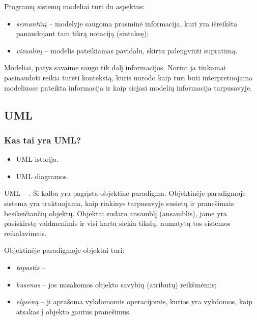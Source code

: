 Programų sistemų modeliai turi du aspektus:
\begin{itemize}
  \item \emph{semantinį} – modelyje saugoma prasminė informacija, kuri
    yra išreikšta panaudojant tam tikrą notaciją (sintaksę);
  \item \emph{vizualinį} – modelis pateikiamas pavidalu, skirtu palengvinti
    supratimą.
\end{itemize}

Modeliai, patys savaime saugo tik dalį informacijos. Norint ja tinkamai
pasinaudoti reikia turėti kontekstą, kuris nurodo kaip turi būti 
interpretuojama modeliuose pateikta informacija ir kaip siejasi modelių
informacija tarpusavyje.

\subsection{UML}


\subsubsection{Kas tai yra UML?}

\begin{itemize}
  \item UML istorija.
  \item UML diagramos.
\end{itemize}

\gls{UML} – . Ši kalba yra pagrįsta objektine paradigma.
Objektinėje paradigmoje sistema yra traktuojama, kaip rinkinys tarpusavyje
susietų ir pranešimais besikeičiančių objektų. Objektai sudaro ansamblį
(\gls{ansamblis}), jame yra pasiskirstę vaidmenimis ir visi kartu siekia
tikslų, numatytų tos sistemos reikalavimais.

Objektinėje paradigmoje objektai turi:
\begin{itemize}
  \item \emph{tapastis} – %
  \item \emph{būsenas} – jos nusakomos objekto savybių (atributų)
    reikšmėmis;
  \item \emph{elgseną} – ji aprašoma vykdomomis operacijomis, kurios
    yra vykdomos, kaip atsakas į objekto gautus pranešimus.
\end{itemize}

